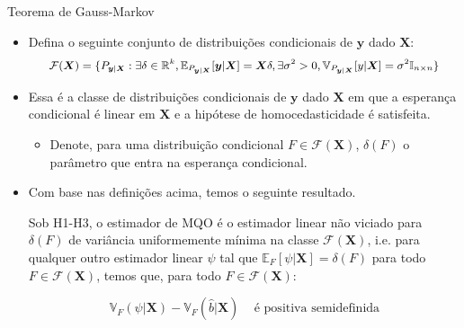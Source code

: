 \documentclass[11pt]{beamer}
\begin{document}
\begin{frame}{Teorema de Gauss-Markov}
	\begin{itemize}
		\item Defina o seguinte conjunto de distribuições condicionais de $\boldsymbol{y}$ dado $\boldsymbol{X}$:
		$$\small \mathcal{F}(\boldsymbol{X}) = \{P_{\boldsymbol{y}|\boldsymbol{X}}: \exists \delta \in \mathbb{R}^k,  \mathbb{E}_{P_{\boldsymbol{y}|\boldsymbol{X}}} [\boldsymbol{y}|\boldsymbol{X}] = \boldsymbol{X}\delta, \exists \sigma^2 > 0, \mathbb{V}_{P_{\boldsymbol{y}|\boldsymbol{X}}}[ y|\boldsymbol{X}] = \sigma^2 \mathbb{I}_{n\times n}\}$$
		\item Essa é a classe de distribuições condicionais de $\boldsymbol{y}$ dado $\boldsymbol{X}$ em que a esperança condicional é linear em $\boldsymbol{X}$ e a hipótese de homocedasticidade é satisfeita.
		\begin{itemize}
			\item Denote, para uma distribuição condicional $F \in \mathcal{F}(\boldsymbol{X}) $, $\delta(F)$ o parâmetro que entra na esperança condicional.
		\end{itemize}
		\item Com base nas definições acima, temos o seguinte resultado.
		\begin{theorem}
		 Sob H1-H3, o estimador de MQO é o estimador {\color{red}linear} não viciado para $\delta(F)$ de variância uniformemente mínima na classe $\mathcal{F}(\boldsymbol{X})$, i.e. para qualquer outro estimador  {\color{red}linear} $\psi$ tal que $\mathbb{E}_{F}[\psi|\boldsymbol{X}] = \delta(F)$ para todo $F \in \mathcal{F}(\boldsymbol{X})$, temos que, para todo $F \in \mathcal{F}(\boldsymbol{X})$:
			
			$$\mathbb{V}_{F}(\psi|\boldsymbol{X}) - \mathbb{V}_{F}(\hat{b}|\boldsymbol{X})\, \quad \text{é positiva semidefinida} $$
		\end{theorem}
	\end{itemize}
\end{frame}
\end{document}
